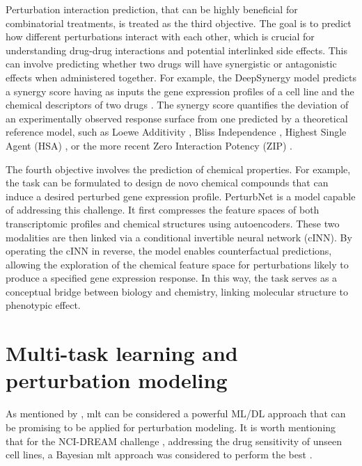 \documentclass[12pt, a4paper]{article}
\begin{document}
Perturbation interaction prediction, that can be highly beneficial for combinatorial treatments, is treated as the third objective. The goal is to predict how different perturbations interact with each other, which is crucial for understanding drug-drug interactions and potential interlinked side effects. This can involve predicting whether two drugs will have synergistic or antagonistic effects when administered together. For example, the DeepSynergy model predicts a synergy score having as inputs the gene expression profiles of a cell line and the chemical descriptors of two drugs \cite{preuer2018deepsynergy}. The synergy score quantifies the deviation of an experimentally observed response surface from one predicted by a theoretical reference model, such as Loewe Additivity \cite{loewe1953problem}, Bliss Independence \cite{bliss1939toxicity}, Highest Single Agent (HSA) \cite{tan2012systematic}, or the more recent Zero Interaction Potency (ZIP) \cite{yadav2015searching}.

The fourth objective involves the prediction of chemical properties. For example, the task can be formulated to design de novo chemical compounds that can induce a desired perturbed gene expression profile. PerturbNet \cite{yuPerturbNetPredictsSinglecell2022} is a model capable of addressing this challenge. It first compresses the feature spaces of both transcriptomic profiles and chemical structures using autoencoders. These two modalities are then linked via a conditional invertible neural network (cINN).
By operating the cINN in reverse, the model enables counterfactual predictions, allowing the exploration of the chemical feature space for perturbations likely to produce a specified gene expression response. In this way, the task serves as a conceptual bridge between biology and chemistry, linking molecular structure to phenotypic effect.

\section{Multi-task learning and perturbation modeling}

As mentioned by \cite{jiMachineLearningPerturbational2021,gavriilidisMinireviewPerturbationModelling2024}, \gls{mlt} can be considered a powerful ML/DL approach that can be promising to be applied for perturbation modeling. It is worth mentioning that for the NCI-DREAM challenge \cite{costello2014community}, addressing the drug sensitivity of unseen cell lines, a Bayesian \gls{mlt} approach was considered to perform the best \cite{schrod2024codex}. 
\end{document}
